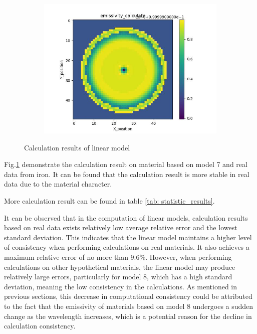 \begin{figure}[htbp]
\begin{minipage}{\textwidth}
\begin{subfigure}{0.49\textwidth}
            \includegraphics[width=\textwidth]{figures/raw_data/5/linear/emi_cal.jpg}
        \end{subfigure}
    \end{minipage}
    \caption{Calculation results of linear model}
    \label{fig: linear_model}
\end{figure}


Fig.\ref{fig: linear_model} demonstrate the calculation result on material based on 
model 7 and real data from iron. It can be found that the calculation result is more
stable in real data due to the material character. 

More calculation result can be found in table \ref{tab: statistic_results}. 


It can be observed that in the computation of linear models, 
calculation results based on real data exists relatively low average relative error and the lowest 
standard deviation. This indicates that the linear model maintains a higher 
level of consistency when performing calculations on real materials. It also 
achieves a maximum relative error of no more than 9.6\%. However, when 
performing calculations on other hypothetical materials, the linear model may 
produce relatively large errors, particularly for model 8, which has a high standard 
deviation, meaning the low consistency in the calculations. As mentioned 
in previous sections, this decrease in computational consistency could be attributed to the 
fact that the emissivity of materials based on model 8 undergoes a sudden change 
as the wavelength increases, which is a potential reason for the decline in 
calculation consistency.

